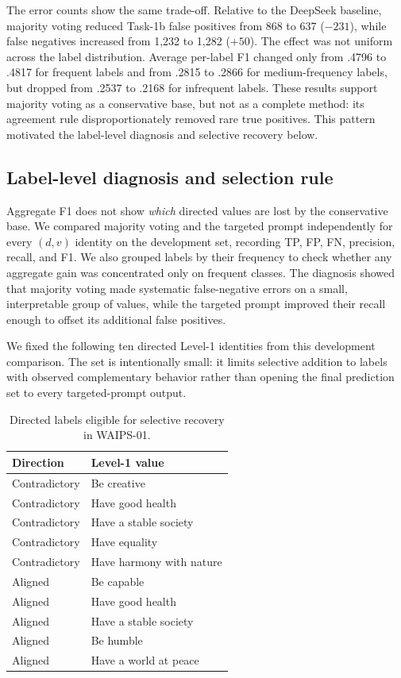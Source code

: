\documentclass[sigconf,article,a4paper]{acmart}
\begin{document}
The error counts show the same trade-off. Relative to the DeepSeek
baseline, majority voting reduced Task-1b false positives from 868 to 637
($-231$), while false negatives increased from 1,232 to 1,282 ($+50$). The
effect was not uniform across the label distribution. Average per-label F1
changed only from .4796 to .4817 for frequent labels and from .2815 to .2866
for medium-frequency labels, but dropped from .2537 to .2168 for infrequent
labels. These results support majority voting as a conservative base, but not
as a complete method: its agreement rule disproportionately removed rare true
positives. This pattern motivated the label-level diagnosis and selective
recovery below.

\subsection{Label-level diagnosis and selection rule}

Aggregate F1 does not show \emph{which} directed values are lost by the
conservative base. We compared majority voting and the targeted
prompt independently for every $(d,v)$ identity on the development set,
recording TP, FP, FN, precision, recall, and F1. We also grouped labels by
their frequency to check whether any aggregate gain was concentrated only on
frequent classes. The diagnosis showed that majority voting made systematic
false-negative errors on a small, interpretable group of values, while the
targeted prompt improved their recall enough to offset its additional false
positives.

We fixed the following ten directed Level-1 identities from this development
comparison. The set is intentionally small: it limits selective addition to
labels with observed complementary behavior rather than opening the final
prediction set to every targeted-prompt output.

\begin{table}[t]
  \caption{Directed labels eligible for selective recovery in WAIPS-01.}
  \label{tab:liu-selected-labels}
  \centering
  \scriptsize
  \begin{tabular}{@{}ll@{}}
    \toprule
    Direction & Level-1 value \\
    \midrule
    Contradictory & Be creative \\
    Contradictory & Have good health \\
    Contradictory & Have a stable society \\
    Contradictory & Have equality \\
    Contradictory & Have harmony with nature \\
    Aligned & Be capable \\
    Aligned & Have good health \\
    Aligned & Have a stable society \\
    Aligned & Be humble \\
    Aligned & Have a world at peace \\
    \bottomrule
  \end{tabular}
\end{table}
\end{document}
